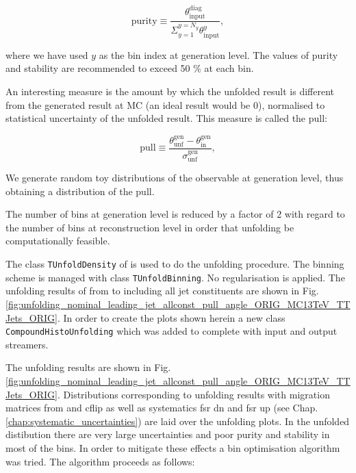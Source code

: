 \begin{equation}
  \text{purity}\equiv\frac{\theta^{\text{diag}}_{\text{input}}}{\Sigma_{y=1}^{y=N_{y}}\theta^{y}_{\text{input}}},
\end{equation}

where we have used $y$ as the bin index at generation level. The values of purity and stability are recommended to exceed 50 \% at each bin.

An interesting measure is the amount by which the unfolded result is different from the generated result at MC (an ideal result would be 0), normalised to statistical uncertainty of the unfolded result. This measure is called the pull:

\begin{equation}
  \text{pull}\equiv\frac{\theta^{\text{gen}}_{\text{unf}}-\theta^{\text{gen}}_{\text{in}}}{\sigma^{\text{gen}}_{\text{unf}}},
\end{equation}

We generate random toy distributions of the observable at generation level, thus obtaining a distribution of the pull.

The number of bins at generation level is reduced by a factor of 2 with regard to the number of bins at reconstruction level in order that unfolding be computationally feasible.

The class \lstinline[language=sh]|TUnfoldDensity|\cite{Schmitt:2012kp} of \ROOT is used to do the unfolding procedure. The binning scheme is managed with class \lstinline[language=sh]|TUnfoldBinning|. No regularisation is applied. The unfolding results of \pullangle from \leadingjet to \scndleadingjet including all jet constituents are shown in Fig. \ref{fig:unfolding_nominal_leading_jet_allconst_pull_angle_ORIG_MC13TeV_TTJets_ORIG}. In order to create the plots shown herein a new class \lstinline[language=sh]|CompoundHistoUnfolding| \cite{url:compoundhistounfolding} which was added to \ROOT complete with input and output streamers.

The unfolding results are shown in Fig. \ref{fig:unfolding_nominal_leading_jet_allconst_pull_angle_ORIG_MC13TeV_TTJets_ORIG}. Distributions corresponding to unfolding results with migration matrices from \ttbar \HERWIGpp and \ttbar cflip as well as systematics \ttbar fsr dn and \ttbar fsr up (see Chap. \ref{chap:systematic_uncertainties}) are laid over the unfolding plots. In the unfolded distibution there are very large uncertainties and poor purity and stability in most of the bins. In order to mitigate these effects a bin optimisation algorithm was tried. The algorithm proceeds as follows:

